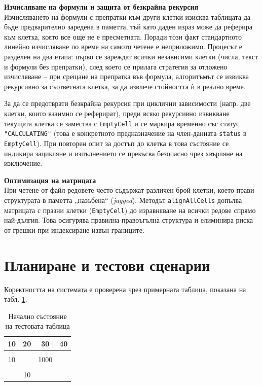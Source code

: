 \textbf{Изчисляване на формули и защита от безкрайна рекурсия} \\
Изчисляването на формули с препратки към други клетки изисква таблицата да бъде предварително заредена в паметта, тъй като даден израз може да реферира към клетка, която все още не е пресметната. Поради този факт стандартното линейно изчисляване по време на самото четене е неприложимо. Процесът е разделен на два етапа: първо се зареждат всички независими клетки (числа, текст и формули без препратки), след което се прилага стратегия за отложено изчисляване -- при срещане на препратка във формула, алгоритъмът се извиква рекурсивно за съответната клетка, за да извлече стойността ѝ в реално време.

За да се предотврати безкрайна рекурсия при циклични зависимости (напр. две клетки, които взаимно се реферират), преди всяко рекурсивно извикване текущата клетка се замества с \texttt{EmptyCell} и се маркира временно със статус \texttt{"CALCULATING"} (това е конкретното предназначение на член-данната \texttt{status} в \texttt{EmptyCell}). При повторен опит за достъп до клетка в това състояние се индикира зацикляне и изпълнението се прекъсва безопасно чрез хвърляне на изключение.

\textbf{Оптимизация на матрицата} \\
При четене от файл редовете често съдържат различен брой клетки, което прави структурата в паметта „назъбена“ (\textit{jagged}). Методът \texttt{alignAllCells} допълва матрицата с празни клетки (\texttt{EmptyCell}) до изравняване на всички редове спрямо най-дългия. Това осигурява правилна правоъгълна структура и елиминира риска от грешки при индексиране извън границите.

\section{Планиране и тестови сценарии}

Коректността на системата е проверена чрез примерната таблица, показана на табл. \ref{tab:test_table}.

\begin{table}[h!]
  \centering
  \begin{tabular}{|c|c|c|c|}
    \hline
    10 & 20 & 30 & 40 \\ \hline
    &    &    &    \\ \hline
    10 &    & 1000 &  \\ \hline
    &    &    &    \\ \hline
    & 10 &    &    \\ \hline
  \end{tabular}
  \caption{Начално състояние на тестовата таблица}
  \label{tab:test_table}
\end{table}

